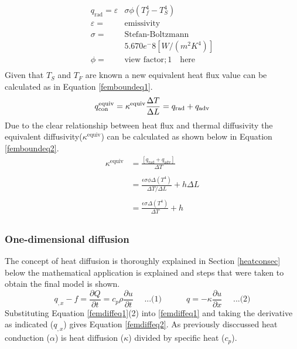 	\begin{equation} \label{radeq}
	       \begin{aligned}
	       q_{\text{rad}} = \varepsilon&\sigma \phi \left(T_f^4 - T_S^4\right)\\
	       \varepsilon =& \text{emissivity}\\
	       \sigma =& \text{Stefan-Boltzmann} \\&5.670 e^-8 [W/(m^2K^4)]\\
	       \phi =& \text{view factor};1 \quad \text{here}\\
	       \end{aligned}
	\end{equation}
	Given that $T_S$ and $T_F$ are known a new equivalent heat flux value can be calculated as in Equation \ref{femboundeq1}.
	\begin{equation} \label{femboundeq1}
	q_{\text{con}}^{\text{equiv}} = \kappa^{\text{equiv}} \frac{\Delta T}{\Delta L} = q_{\text{rad}} + q_{\text{adv}}\\
	\end{equation}
	Due to the clear relationship between heat flux and thermal diffusivity the equivalent diffusivity($\kappa^{\text{equiv}}$) can be calculated as shown below in Equation \ref{femboundeq2}. 
	\begin{equation}\label{femboundeq2}
	\begin{aligned}
	\kappa^{\text{equiv}} &= \frac{\left[q_{\text{rad}} + q_{\text{adv}} \right]}{\Delta T}\\
	&\quad\\
	&= \frac{\epsilon \sigma \phi \Delta \left(T^4\right)}{\Delta T / \Delta L } + h \Delta L\\
	&\quad\\
	&= \frac{\epsilon \sigma \Delta \left(T^4\right)}{\Delta T   } + h\\
	\end{aligned}
	\end{equation}
	
	\subsubsection{One-dimensional diffusion}
The concept of heat diffusion is thoroughly explained in Section \ref{heatconsec} below the mathematical application is explained and steps that were taken to obtain the final model is shown.
	\begin{equation}\label{femdiffeq1}
	q_{,x} - f = \frac{\partial Q}{\partial t} = c_p \rho \frac{\partial u}{\partial t}\quad\text{  ...(1)} \quad\quad\quad q = -\kappa \frac{\partial u}{\partial x}\quad\text{  ...(2)}
\end{equation}
Substituting Equation \ref{femdiffeq1}(2) into \ref{femdiffeq1} and taking the derivative as indicated ($q_{,x}$) gives Equation \ref{femdiffeq2}. 
As previously disccussed heat conduction ($\alpha$) is heat diffusion ($\kappa$)  divided by specific heat ($c_p$).


